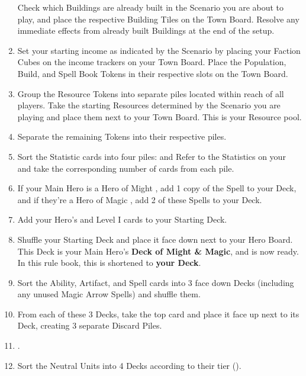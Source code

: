 \begin{multicols*}{2}
\begin{enumerate}[leftmargin=2.3em]
    Check which Buildings are already built in the Scenario you are about to play, and place the respective Building Tiles on the Town Board.
    Resolve any immediate effects from already built Buildings at the end of the setup.
  \item Set your starting income as indicated by the Scenario by placing your Faction Cubes on the income trackers on your Town Board.
    Place the Population, Build, and Spell Book Tokens in their respective slots on the Town Board.
  \item Group the Resource Tokens into separate piles located within reach of all players.
    Take the starting Resources determined by the Scenario you are playing and place them next to your Town Board.
    This is your Resource pool.
  \item Separate the remaining Tokens into their respective piles.
  \item {} Sort the Statistic cards into four piles:    and 
    Refer to the Statistics on your  and take the corresponding number of cards from each pile.
  \item If your Main Hero is a Hero of Might , add 1 copy of the  Spell to your Deck, and if they’re a Hero of Magic , add 2 of these Spells to your Deck.
  \columnbreak
  \item \label{SetupStartingDeckEnd} Add your Hero's  and Level I  cards to your Starting Deck.
  \item Shuffle your Starting Deck and place it face down next to your Hero Board.
    This Deck is your Main Hero's \textbf{Deck of Might \& Magic}, and is now ready. In this rule book, this is shortened to \textbf{your Deck}.
  \item Sort the Ability, Artifact, and Spell cards into 3 face down Decks (including any unused Magic Arrow Spells) and shuffle them.
  \item From each of these 3 Decks, take the top card and place it face up next to its Deck, creating 3 separate Discard Piles.
  \item {}.
  \item Sort the Neutral Units into 4 Decks according to their tier ().

\end{enumerate}
\end{multicols*}
